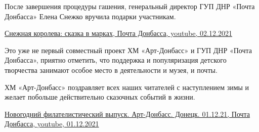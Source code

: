 
После завершения процедуры гашения, генеральный директор ГУП ДНР «Почта
Донбасса» Елена Снежко вручила подарки участникам.

\href{https://youtu.be/npAy2WA8mnI}{%
Снежная королева: сказка в марках, Почта Донбасса, youtube, 02.12.2021%
}


Это уже не первый совместный проект ХМ «Арт-Донбасс» и ГУП ДНР «Почта
Донбасса», приятно отметить, что поддержка и популяризация детского творчества
занимают особое место в деятельности и музея, и почты.

ХМ «Арт-Донбасс» поздравляет всех наших читателей с наступлением зимы и желает
побольше действительно сказочных событий в жизни.

\href{https://www.youtube.com/watch?v=B08b9o5x7t4}{%
Новогодний филателистический выпуск. Арт-Донбасс. Донецк. 01.12.21, Почта Донбасса, youtube, 01.12.2021%
}

